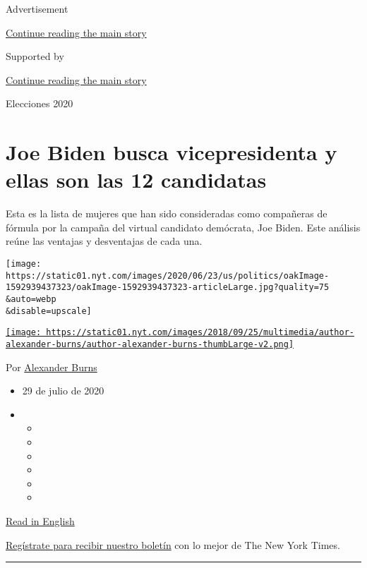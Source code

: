 Advertisement

\protect\hyperlink{after-top}{Continue reading the main story}

Supported by

\protect\hyperlink{after-sponsor}{Continue reading the main story}

Elecciones 2020

\hypertarget{joe-biden-busca-vicepresidenta-y-ellas-son-las-12-candidatas}{%
\section{Joe Biden busca vicepresidenta y ellas son las 12
candidatas}\label{joe-biden-busca-vicepresidenta-y-ellas-son-las-12-candidatas}}

Esta es la lista de mujeres que han sido consideradas como compañeras de
fórmula por la campaña del virtual candidato demócrata, Joe Biden. Este
análisis reúne las ventajas y desventajas de cada una.

\texttt{[image: https://static01.nyt.com/images/2020/06/23/us/politics/oakImage-1592939437323/oakImage-1592939437323-articleLarge.jpg?quality=75\\\&auto=webp\\\&disable=upscale]}

\href{https://www.nytimes.com/by/alexander-burns}{\texttt{[image: https://static01.nyt.com/images/2018/09/25/multimedia/author-alexander-burns/author-alexander-burns-thumbLarge-v2.png]}}

Por \href{https://www.nytimes.com/by/alexander-burns}{Alexander Burns}

\begin{itemize}
\item
  29 de julio de 2020
\item
  \begin{itemize}
  \item
  \item
  \item
  \item
  \item
  \item
  \end{itemize}
\end{itemize}

\href{https://www.nytimes.com/article/biden-vice-president-2020.html}{Read
in English}

\href{https://www.nytimes.com/newsletters/el-times}{Regístrate para
recibir nuestro boletín} con lo mejor de The New York Times.

\begin{center}\rule{0.5\linewidth}{\linethickness}\end{center}

